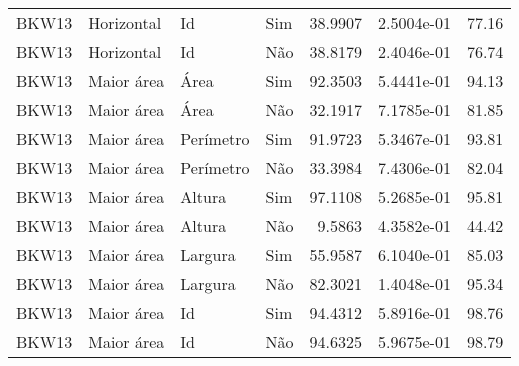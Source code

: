 \begin{tabular}{llllrrr}
    BKW13     & Horizontal & Id        & Sim         & 38.9907      & 2.5004e-01 & 77.16    \\
    BKW13     & Horizontal & Id        & Não         & 38.8179      & 2.4046e-01 & 76.74    \\
    BKW13     & Maior área & Área      & Sim         & 92.3503      & 5.4441e-01 & 94.13    \\
    BKW13     & Maior área & Área      & Não         & 32.1917      & 7.1785e-01 & 81.85    \\
    BKW13     & Maior área & Perímetro & Sim         & 91.9723      & 5.3467e-01 & 93.81    \\
    BKW13     & Maior área & Perímetro & Não         & 33.3984      & 7.4306e-01 & 82.04    \\
    BKW13     & Maior área & Altura    & Sim         & 97.1108      & 5.2685e-01 & 95.81    \\
    BKW13     & Maior área & Altura    & Não         & 9.5863       & 4.3582e-01 & 44.42    \\
    BKW13     & Maior área & Largura   & Sim         & 55.9587      & 6.1040e-01 & 85.03    \\
    BKW13     & Maior área & Largura   & Não         & 82.3021      & 1.4048e-01 & 95.34    \\
    BKW13     & Maior área & Id        & Sim         & 94.4312      & 5.8916e-01 & 98.76    \\
    BKW13     & Maior área & Id        & Não         & 94.6325      & 5.9675e-01 & 98.79    \\
    \hline
\end{tabular}